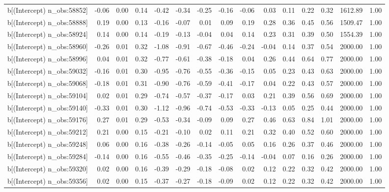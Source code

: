 \begin{table}[ht]
\begin{tabular}{rrrrrrrrrrrrrrr}
  b[(Intercept) n\_obs:58852] & -0.06 & 0.00 & 0.14 & -0.42 & -0.34 & -0.25 & -0.16 & -0.06 & 0.03 & 0.11 & 0.22 & 0.32 & 1612.89 & 1.00 \\ 
  b[(Intercept) n\_obs:58888] & 0.19 & 0.00 & 0.13 & -0.16 & -0.07 & 0.01 & 0.09 & 0.19 & 0.28 & 0.36 & 0.45 & 0.56 & 1509.47 & 1.00 \\ 
  b[(Intercept) n\_obs:58924] & 0.14 & 0.00 & 0.14 & -0.19 & -0.13 & -0.04 & 0.04 & 0.14 & 0.23 & 0.31 & 0.39 & 0.50 & 1554.39 & 1.00 \\ 
  b[(Intercept) n\_obs:58960] & -0.26 & 0.01 & 0.32 & -1.08 & -0.91 & -0.67 & -0.46 & -0.24 & -0.04 & 0.14 & 0.37 & 0.54 & 2000.00 & 1.00 \\ 
  b[(Intercept) n\_obs:58996] & 0.04 & 0.01 & 0.32 & -0.77 & -0.61 & -0.38 & -0.18 & 0.04 & 0.26 & 0.44 & 0.64 & 0.77 & 2000.00 & 1.00 \\ 
  b[(Intercept) n\_obs:59032] & -0.16 & 0.01 & 0.30 & -0.95 & -0.76 & -0.55 & -0.36 & -0.15 & 0.05 & 0.23 & 0.43 & 0.63 & 2000.00 & 1.00 \\ 
  b[(Intercept) n\_obs:59068] & -0.18 & 0.01 & 0.31 & -0.90 & -0.76 & -0.59 & -0.41 & -0.17 & 0.04 & 0.22 & 0.43 & 0.57 & 2000.00 & 1.00 \\ 
  b[(Intercept) n\_obs:59104] & 0.02 & 0.01 & 0.29 & -0.74 & -0.57 & -0.37 & -0.17 & 0.03 & 0.21 & 0.39 & 0.56 & 0.69 & 2000.00 & 1.00 \\ 
  b[(Intercept) n\_obs:59140] & -0.33 & 0.01 & 0.30 & -1.12 & -0.96 & -0.74 & -0.53 & -0.33 & -0.13 & 0.05 & 0.25 & 0.44 & 2000.00 & 1.00 \\ 
  b[(Intercept) n\_obs:59176] & 0.27 & 0.01 & 0.29 & -0.53 & -0.34 & -0.09 & 0.09 & 0.27 & 0.46 & 0.63 & 0.84 & 1.01 & 2000.00 & 1.00 \\ 
  b[(Intercept) n\_obs:59212] & 0.21 & 0.00 & 0.15 & -0.21 & -0.10 & 0.02 & 0.11 & 0.21 & 0.32 & 0.40 & 0.52 & 0.60 & 2000.00 & 1.00 \\ 
  b[(Intercept) n\_obs:59248] & 0.06 & 0.00 & 0.16 & -0.38 & -0.26 & -0.14 & -0.05 & 0.05 & 0.16 & 0.26 & 0.37 & 0.46 & 2000.00 & 1.00 \\ 
  b[(Intercept) n\_obs:59284] & -0.14 & 0.00 & 0.16 & -0.55 & -0.46 & -0.35 & -0.25 & -0.14 & -0.04 & 0.07 & 0.16 & 0.26 & 2000.00 & 1.00 \\ 
  b[(Intercept) n\_obs:59320] & 0.02 & 0.00 & 0.16 & -0.39 & -0.29 & -0.18 & -0.08 & 0.02 & 0.12 & 0.22 & 0.32 & 0.42 & 2000.00 & 1.00 \\ 
  b[(Intercept) n\_obs:59356] & 0.02 & 0.00 & 0.15 & -0.37 & -0.27 & -0.18 & -0.09 & 0.02 & 0.12 & 0.22 & 0.32 & 0.42 & 2000.00 & 1.00 \\ 

\end{tabular}
\end{table}
